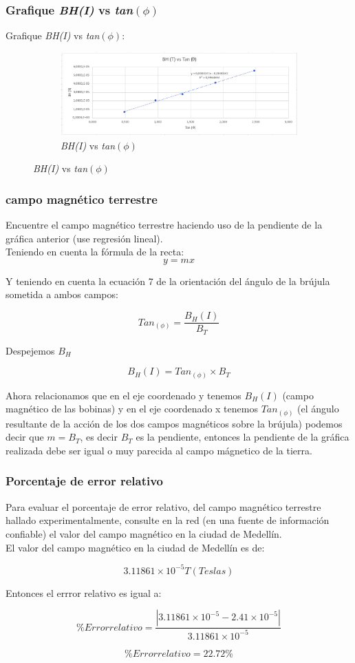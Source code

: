 \subsubsection{Grafique \textit{BH(I)} vs \textit{tan\((\phi)\)}}
Grafique \textit{BH(I)} vs \textit{tan\((\phi)\)}:

\begin{figure}[H]
    \centering
    \begin{subfigure}[b]{\textwidth}
        \centering
        \includegraphics[width=\textwidth]{Figures/0. General/2.4.png}
        \caption{\textit{BH(I)} vs \textit{tan\((\phi)\)}}
    \end{subfigure}
\end{figure}


\subsubsection{campo magnético terrestre}
Encuentre el campo magnético terrestre haciendo uso de la pendiente de la
gráfica anterior (use regresión lineal).\\

Teniendo en cuenta la fórmula de la recta:
\[ y = mx\]

Y teniendo en cuenta la ecuación 7 de la orientación del ángulo de la brújula
sometida a ambos campos:

\[ Tan_{(\phi)} = \frac{B_{H}(I)}{B_{T}} \]

Despejemos $B_{H}$

\[ B_{H}(I) = Tan_{(\phi)} \times B_{T} \]

Ahora relacionamos que en el eje coordenado y tenemos $B_{H}(I)$ (campo
magnético de las bobinas) y en el eje coordenado x tenemos $Tan_{(\phi)}$ (el
ángulo resultante de la acción de los dos campos magnéticos sobre la brújula)
podemos decir que $m = B_{T}$, es decir $B_{T}$ es la pendiente, entonces la
pendiente de la gráfica realizada debe ser igual o muy parecida al campo
mágnetico de la tierra.


\subsubsection{Porcentaje de error relativo}
Para evaluar el porcentaje de error relativo, del campo magnético terrestre
hallado experimentalmente, consulte en la red (en una fuente de información
confiable) el valor del campo magnético en la ciudad de Medellín.\\

El valor del campo magnético en la ciudad de Medellín es de:

\[ 3.11861\times10^{-5} T (Teslas)\]

Entonces el errror relativo es igual a:

\[ \%Error relativo = \frac{|3.11861\times10^{-5} - 2.41\times10^{-5}|}{3.11861\times10^{-5}}\]

\[ \%Error relativo = 22.72\%\]
